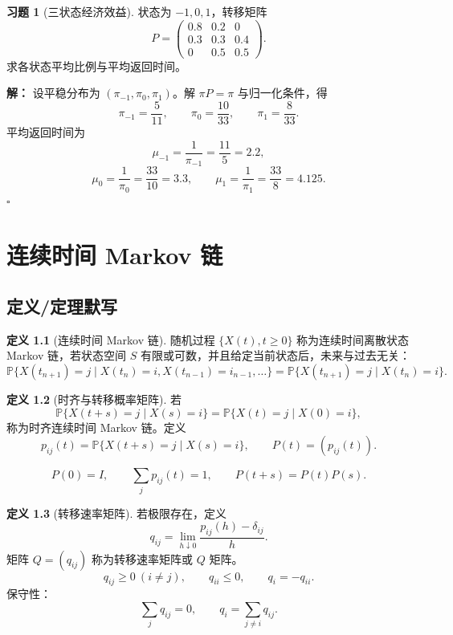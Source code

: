 \documentclass[12pt,a4paper,openany]{ctexrep}
\theoremstyle{definition}
\newtheorem{definition}{定义}[section]
\newtheorem{exercise}{习题}[section]
\newenvironment{solution}{\par\noindent\textbf{解：}}{\hfill$\square$\par}
\newcommand{\Pp}{\mathbb{P}}
\begin{document}
\begin{exercise}[三状态经济效益]
状态为 $-1,0,1$，转移矩阵
\[
P=
\begin{pmatrix}
0.8&0.2&0\\
0.3&0.3&0.4\\
0&0.5&0.5
\end{pmatrix}.
\]
求各状态平均比例与平均返回时间。
\end{exercise}

\begin{solution}
设平稳分布为 $(\pi_{-1},\pi_0,\pi_1)$。解 $\pi P=\pi$ 与归一化条件，得
\[
\pi_{-1}=\frac5{11},\qquad
\pi_0=\frac{10}{33},\qquad
\pi_1=\frac8{33}.
\]
平均返回时间为
\[
\mu_{-1}=\frac1{\pi_{-1}}=\frac{11}{5}=2.2,
\]
\[
\mu_0=\frac1{\pi_0}=\frac{33}{10}=3.3,
\qquad
\mu_1=\frac1{\pi_1}=\frac{33}{8}=4.125.
\]
\end{solution}

\chapter{连续时间 Markov 链}

\section{定义/定理默写}

\begin{definition}[连续时间 Markov 链]
随机过程 $\{X(t),t\ge0\}$ 称为连续时间离散状态 Markov 链，若状态空间 $S$ 有限或可数，并且给定当前状态后，未来与过去无关：
\[
\Pp\{X(t_{n+1})=j\mid X(t_n)=i,X(t_{n-1})=i_{n-1},\dots\}
=
\Pp\{X(t_{n+1})=j\mid X(t_n)=i\}.
\]
\end{definition}

\begin{definition}[时齐与转移概率矩阵]
若
\[
\Pp\{X(t+s)=j\mid X(s)=i\}
=
\Pp\{X(t)=j\mid X(0)=i\},
\]
称为时齐连续时间 Markov 链。定义
\[
p_{ij}(t)=\Pp\{X(t+s)=j\mid X(s)=i\},\qquad P(t)=(p_{ij}(t)).
\]
\end{definition}

\[
P(0)=I,\qquad \sum_jp_{ij}(t)=1,\qquad P(t+s)=P(t)P(s).
\]

\begin{definition}[转移速率矩阵]
若极限存在，定义
\[
q_{ij}=\lim_{h\downarrow0}\frac{p_{ij}(h)-\delta_{ij}}{h}.
\]
矩阵 $Q=(q_{ij})$ 称为转移速率矩阵或 $Q$ 矩阵。
\[
q_{ij}\ge0\ (i\ne j),\qquad q_{ii}\le0,\qquad q_i=-q_{ii}.
\]
保守性：
\[
\sum_jq_{ij}=0,\qquad q_i=\sum_{j\ne i}q_{ij}.
\]
\end{definition}
\end{document}

